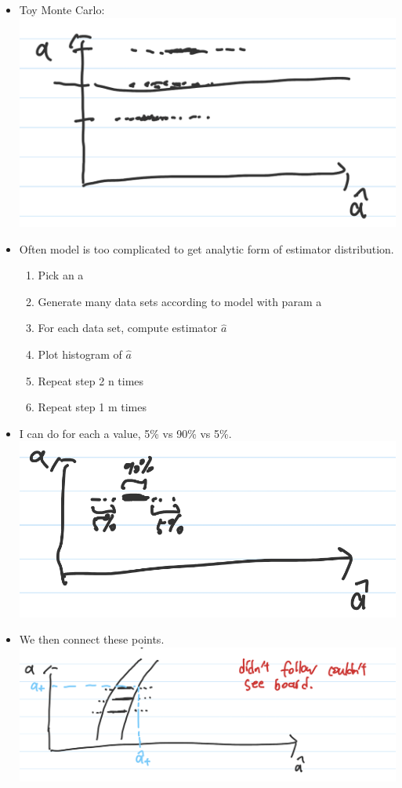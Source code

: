 \begin{itemize}
          \divider
    \item Toy Monte Carlo:
          \includegraphics[width = 0.6\linewidth]{Images/lec11-toy-monte-carlo.png}
    \item Often model is too complicated to get analytic form of estimator distribution.
          \begin{enumerate}
              \item Pick an a
              \item Generate many data sets according to model with param a
              \item For each data set, compute estimator $\hat{a}$
              \item Plot histogram of $\hat{a}$
              \item Repeat step 2 n times
              \item Repeat step 1 m times
          \end{enumerate}
    \item I can do for each a value, 5\% vs 90\% vs 5\%. \\
          \includegraphics[width = 0.6\linewidth]{Images/lec11-mc-intervals.png}\\
    \item We then connect these points.\\
          \includegraphics[width = 0.6\linewidth]{Images/lec11-fit-connect.png}\\

\end{itemize}
